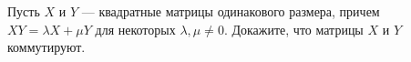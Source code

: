 \documentclass{article}
\begin{document}
Пусть $X$ и $Y$ --- квадратные матрицы одинакового размера,
 причем $XY = \lambda X + \mu Y$ для некоторых $\lambda, \mu \neq 0$. Докажите, что матрицы $X$ и $Y$ коммутируют.
\end{document}
